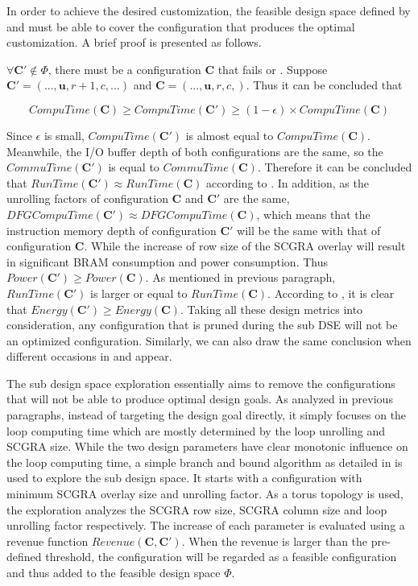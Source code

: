 In order to achieve the desired customization, the feasible design space defined by  and  must be able to cover the configuration that produces the optimal customization. A brief proof is presented as follows.

$\forall \bm{C'} \notin \Phi$, there must be a configuration $\bm{C}$ that fails  or . Suppose $\bm{C'}=(...,\bm{u},r+1,c,...)$ and $\bm{C}=(...,\bm{u},r,c,)$. Thus it can be concluded that 

\begin{equation}
   CompuTime(\bm{C}) \geq  CompuTime(\bm{C'}) \geq (1-\epsilon) \times CompuTime(\bm{C})
\end{equation}

Since $\epsilon$ is small, $CompuTime(\bm{C'})$ is almost equal to $CompuTime(\bm{C})$. Meanwhile, the I/O buffer depth of both configurations are the same, so the $CommuTime(\bm{C'})$ is equal to $CommuTime(\bm{C})$. Therefore it can be concluded that $RunTime(\bm{C'}) \approx RunTime(\bm{C})$ according to . In addition, as the unrolling factors of configuration $\bm{C}$ and $\bm{C'}$ are the same, $DFGCompuTime(\bm{C'}) \approx DFGCompuTime(\bm{C})$, which means that the instruction memory depth of configuration $\bm{C'}$ will be the same with that of configuration $\bm{C}$. While the increase of row size of the SCGRA overlay will result in significant BRAM consumption and power consumption. Thus $Power(\bm{C'}) \geq Power(\bm{C})$. As mentioned in previous paragraph, $RunTime(\bm{C'})$ is larger or equal to $RunTime(\bm{C})$. According to , it is clear that $Energy(\bm{C'}) \geq Energy(\bm{C})$. Taking all these design metrics into consideration, any configuration that is pruned during the sub DSE will not be an optimized configuration. Similarly, we can also draw the same conclusion when different occasions in  and  appear.

The sub design space exploration essentially aims to remove the configurations that will not be able to produce optimal design goals. As analyzed in previous paragraphs, instead of targeting the design goal directly, it simply focuses on the loop computing time which are mostly determined by the loop unrolling and SCGRA size. While the two design parameters have clear monotonic influence on the loop computing time, a simple branch and bound algorithm as detailed in  is used to explore the sub design space. It starts with a configuration with minimum SCGRA overlay size and unrolling factor. As a torus topology is used, the exploration analyzes the SCGRA row size, SCGRA column size and loop unrolling factor respectively. The increase of each parameter is evaluated using a revenue function $Revenue(\bm{C}, \bm{C'})$. When the revenue is larger than the pre-defined threshold, the configuration will be regarded as a feasible configuration and thus added to the feasible design space $\Phi$. 

